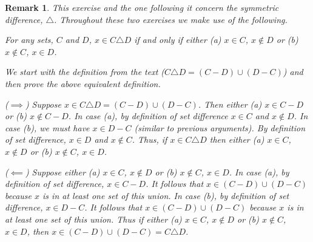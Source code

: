 \documentclass[12pt]{article}
\newtheorem{remark}{Remark}
\numberwithin{theorem}{section}
\numberwithin{equation}{section}
\numberwithin{remark}{section}
\numberwithin{definition}{section}
\numberwithin{theorem}{section}
\numberwithin{lemma}{section}
\numberwithin{example}{section}
\begin{document}
\begin{remark}
	This exercise and the one following it concern the symmetric difference, $\triangle$. Throughout these two exercises we make use of the following. 
	\begin{center}
		For any sets, $C$ and $D$, $x\in C \triangle D$ if and only if either (a) $x\in C$, $x\notin D$ or (b) $x\notin C$, $x\in D$.
	\end{center}
	We start with the definition from the text ($C \triangle D = (C-D)\cup(D-C)$) and then prove the above equivalent definition. 
	
	\vspace{\baselineskip}
	
	\noindent ($\implies$) Suppose $x \in C \triangle D = (C-D)\cup(D-C)$. Then either (a) $x\in C-D$ or (b) $x\notin C-D$. In case (a), by definition of set difference $x\in C$ and $x\notin D$. In case (b), we must have $x\in D-C$ (similar to previous arguments). By definition of set difference, $x\in D$ and $x\notin C$. Thus, if $x\in C \triangle D$ then either (a) $x\in C$, $x\notin D$ or (b) $x\notin C$, $x\in D$.
	
	\vspace{\baselineskip}
	
	\noindent ($\impliedby$) Suppose either (a) $x\in C$, $x\notin D$ or (b) $x\notin C$, $x\in D$. In case (a), by definition of set difference, $x\in C - D$. It follows that $x \in (C - D) \cup (D - C)$ because $x$ is in at least one set of this union. In case (b), by definition of set difference, $x \in D - C$. It follows that $x \in (C - D) \cup (D - C)$ because $x$ is in at least one set of this union. Thus if either (a) $x\in C$, $x\notin D$ or (b) $x\notin C$, $x\in D$, then $x\in (C - D) \cup (D - C) = C \triangle D$. 
	
\end{remark} 
\end{document}
